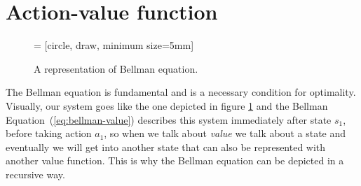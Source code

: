 \section{Action-value function}

\begin{figure} [ht]    
     = [circle, draw, minimum size=5mm]
        
    \centering
    \caption{A representation of Bellman equation.}
    \label{fig:bellman}
\end{figure}
The Bellman equation is fundamental and is a necessary condition for optimality. Visually, our system goes like the one depicted in figure \ref{fig:bellman} and the Bellman Equation~(\ref{eq:bellman-value}) describes this system immediately after state $s_1$, before taking action $a_1$, so when we talk about \textit{value} we talk about a state and eventually we will get into another state that can also be represented with another value function. This is why the Bellman equation can be depicted in a recursive way.

